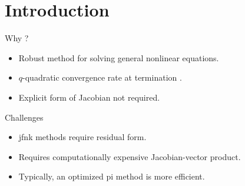 \section{Introduction}
\label{sec:introduction}

\begin{frame}{Why ?}
  \begin{itemize}
    \item Robust method for solving general nonlinear equations.
    \item $q$-quadratic convergence rate at termination \cite{textbookkelley}.
    \item Explicit form of Jacobian not required.
  \end{itemize}
\end{frame}

\begin{frame}{ Challenges}
  \begin{itemize}
    \item \gls{jfnk} methods require residual form.
    \item Requires computationally expensive Jacobian-vector product.
    \item Typically, an optimized \gls{pi} method is more efficient.
  \end{itemize}
\end{frame}
